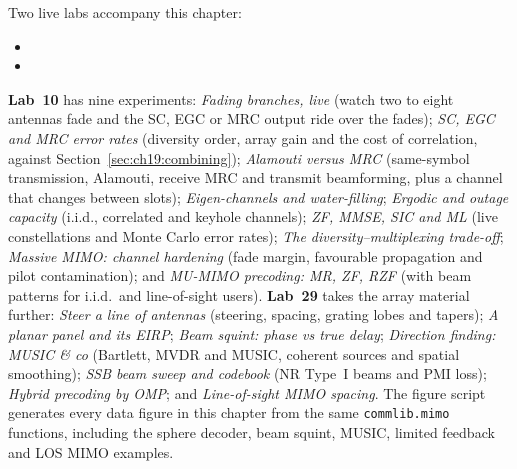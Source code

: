 \begin{labbox}
Two live labs accompany this chapter:
\begin{itemize}
\item {}
\item {}
\end{itemize}
\textbf{Lab~10} has nine experiments: \emph{Fading branches, live} (watch two to eight antennas fade
and the SC, EGC or MRC output ride over the fades); \emph{SC, EGC and MRC error rates} (diversity
order, array gain and the cost of correlation, against Section~\ref{sec:ch19:combining});
\emph{Alamouti versus MRC} (same-symbol transmission, Alamouti, receive MRC and transmit
beamforming, plus a channel that changes between slots); \emph{Eigen-channels and water-filling};
\emph{Ergodic and outage capacity} (i.i.d., correlated and keyhole channels);
\emph{ZF, MMSE, SIC and ML} (live constellations and Monte Carlo error rates); \emph{The
diversity--multiplexing trade-off}; \emph{Massive MIMO: channel hardening} (fade margin, favourable
propagation and pilot contamination); and \emph{MU-MIMO precoding: MR, ZF, RZF} (with beam patterns
for i.i.d.\ and line-of-sight users).
\textbf{Lab~29} takes the array material further: \emph{Steer a line of antennas} (steering,
spacing, grating lobes and tapers); \emph{A planar panel and its EIRP}; \emph{Beam squint: phase vs
true delay}; \emph{Direction finding: MUSIC \& co} (Bartlett, MVDR and MUSIC, coherent sources and
spatial smoothing); \emph{SSB beam sweep and codebook} (NR Type~I beams and PMI loss); \emph{Hybrid
precoding by OMP}; and \emph{Line-of-sight MIMO spacing}. The figure script
 generates every data figure in this chapter from the same
\texttt{commlib.mimo} functions, including the sphere decoder, beam squint, MUSIC, limited feedback
and LOS MIMO examples.
\end{labbox}

